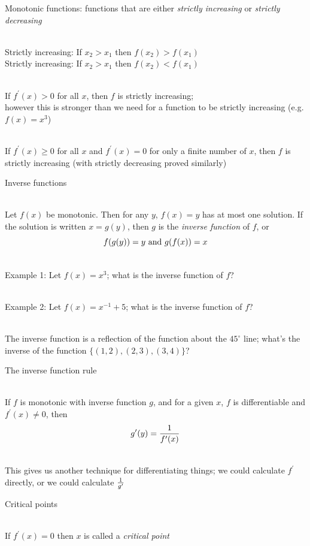 \documentclass[10pt]{seminar}
\begin{document}
\begin{slide}
\newslide

Monotonic functions: functions that are either \textit{strictly increasing} or \textit{strictly decreasing}

\ \\Strictly increasing: If $x_2>x_1$ then $f(x_2)>f(x_1)$
\ \\Strictly increasing: If $x_2>x_1$ then $f(x_2)<f(x_1)$


\ \\If $f^\prime(x)>0$ for all $x$, then $f$ is strictly increasing; \\however this is stronger than we need for a function to be strictly increasing (e.g. $f(x)=x^3$)

\ \\If $f^\prime(x)\geq 0$ for all $x$ and $f^\prime(x)=0$ for only a finite number of $x$, then $f$ is strictly increasing (with strictly decreasing proved similarly)

\newslide
Inverse functions

\ \\Let $f(x)$ be monotonic.  Then for any $y$, $f(x)=y$ has at most one solution. If the solution is written $x=g(y)$, then $g$ is the \textit{inverse function} of $f$, or $$f(g(y))=y \hbox{ and }g(f(x))=x$$

\ \\Example 1:  Let $f(x)=x^3$; what is the inverse function of $f$?

\ \\Example 2: Let $f(x)=x^{-1}+5$; what is the inverse function of $f$?

\ \\The inverse function is a reflection of the function about the $45^\circ$ line; what's the inverse of the function $\{(1, 2),(2, 3), (3, 4)\}$?

\newslide 
The inverse function rule

\ \\If $f$ is monotonic with inverse function $g$, and for a given $x$, $f$ is differentiable and $f^\prime(x)\not=0$, then $$g^\prime(y)={1\over {f^\prime(x)}}$$


\ \\This gives us another technique for differentiating things; we could calculate $f^\prime$ directly, or we could calculate $1\over{g^\prime}$

\newslide
Critical points

\ \\If $f^\prime(x)=0$ then $x$ is called a \textit{critical point}


\end{slide}
\end{document}
